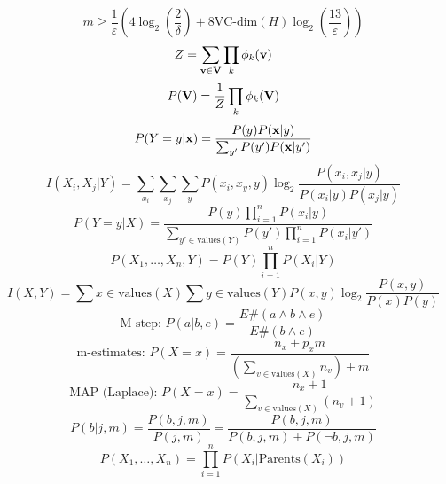 \documentclass[10pt,fleqn]{minimal}
\begin{document}
{{\begin{equation}
	m \geq \frac{1}{\varepsilon} \left( 4 \log_2 \left(\frac{2}{\delta} \right) + 8 \text{VC-dim}(H) \log_2 \left(\frac{13}{\varepsilon} \right) \right)
\end{equation}
\begin{equation}
	Z = \sum_{\bold{v} \in \bold{V}} \prod_k \phi_k(\bold{v})
\end{equation}
\begin{equation}
	P(\bold{V}) = \frac{1}{Z} \prod_k \phi_k(\bold{V})
\end{equation}
\begin{equation}
	P(Y=y|\bold{x}) = \frac{P(y)P(\bold{x}|y)}{\sum_{y'}P(y')P(\bold{x}|y')}
\end{equation}
\begin{equation}
	I(X_i,X_j|Y) = \sum_{x_i} \sum_{x_j} \sum_{y}  P(x_i,x_y,y) \log_2 \frac{P(x_i,x_j|y)}{P(x_i|y)P(x_j|y)}
\end{equation}
\begin{equation}
	P(Y=y|X) = \frac{P(y)\prod_{i=1}^n P(x_i|y)}{\sum_{y' \in \text{values}(Y)} P(y')\prod_{i=1}^n P(x_i|y')}
\end{equation}
\begin{equation}
	P(X_1,\dots,X_n,Y) = P(Y) \prod_{i=1}^n P(X_i|Y)
\end{equation}
\begin{equation}
	I(X,Y) = \sum{x \in \text{values}(X)} \sum{y \in \text{values}(Y)} P(x,y) \log_2 \frac{P(x,y)}{P(x)P(y)}
\end{equation}
\begin{equation}
	\text{M-step: } P(a|b,e) = \frac{E\#(a \wedge b \wedge e)}{E\#( b \wedge e)}
\end{equation}
\begin{equation}
	\text{m-estimates: } P(X=x) = \frac{n_x+p_xm}{\left(\sum_{v \in \text{values}(X)} n_v \right) + m}
\end{equation}
\begin{equation}
	\text{MAP (Laplace): } P(X=x) = \frac{n_x+1}{\sum_{v \in \text{values}(X)} (n_v+1)}
\end{equation}
\begin{equation}
	P(b|j,m) = \frac{P(b,j,m)}{P(j,m)} = \frac{P(b,j,m)}{P(b,j,m) + P(\neg b,j,m)}
\end{equation}
\begin{equation}
	P(X_1, \dots,X_n) = \prod_{i=1}^n P(X_i | \text{Parents}(X_i))
\end{equation}
\begin{equation}

\end{equation}}}
\end{document}
